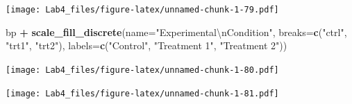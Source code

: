 \documentclass[]{article}
\newenvironment{Shaded}{\begin{snugshade}}{\end{snugshade}}
\newcommand{\KeywordTok}[1]{\textcolor[rgb]{0.13,0.29,0.53}{\textbf{#1}}}
\newcommand{\DataTypeTok}[1]{\textcolor[rgb]{0.13,0.29,0.53}{#1}}
\newcommand{\CharTok}[1]{\textcolor[rgb]{0.31,0.60,0.02}{#1}}
\newcommand{\StringTok}[1]{\textcolor[rgb]{0.31,0.60,0.02}{#1}}
\newcommand{\CommentTok}[1]{\textcolor[rgb]{0.56,0.35,0.01}{\textit{#1}}}
\newcommand{\OperatorTok}[1]{\textcolor[rgb]{0.81,0.36,0.00}{\textbf{#1}}}
\newcommand{\NormalTok}[1]{#1}
\begin{document}
\texttt{[image: Lab4\_files/figure-latex/unnamed-chunk-1-79.pdf]}

\begin{Shaded}
\begin{Highlighting}[]
\NormalTok{bp }\OperatorTok{+}\StringTok{ }\KeywordTok{scale_fill_discrete}\NormalTok{(}\DataTypeTok{name=}\StringTok{"Experimental}\CharTok{\textbackslash{}n}\StringTok{Condition"}\NormalTok{,}
                         \DataTypeTok{breaks=}\KeywordTok{c}\NormalTok{(}\StringTok{"ctrl"}\NormalTok{, }\StringTok{"trt1"}\NormalTok{, }\StringTok{"trt2"}\NormalTok{),}
                         \DataTypeTok{labels=}\KeywordTok{c}\NormalTok{(}\StringTok{"Control"}\NormalTok{, }\StringTok{"Treatment 1"}\NormalTok{, }\StringTok{"Treatment 2"}\NormalTok{))}
\end{Highlighting}
\end{Shaded}

\texttt{[image: Lab4\_files/figure-latex/unnamed-chunk-1-80.pdf]}

\begin{Shaded}
\end{Shaded}

\texttt{[image: Lab4\_files/figure-latex/unnamed-chunk-1-81.pdf]}
\end{document}
